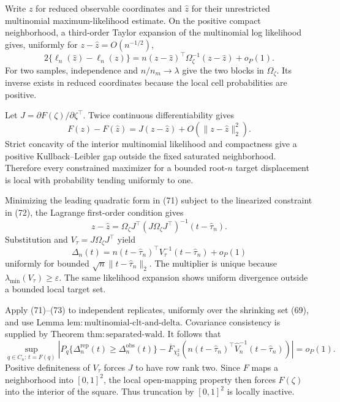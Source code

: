 Write \(z\) for reduced observable coordinates and \(\widehat z\) for their unrestricted multinomial maximum-likelihood estimate.  On the positive compact neighborhood, a third-order Taylor expansion of the multinomial log likelihood gives, uniformly for \(z-\widehat z=O(n^{-1/2})\),
\[
 2\{\ell_n(\widehat z)-\ell_n(z)\}
 =n(z-\widehat z)^{\top}\Omega_{\zeta}^{-1}
       (z-\widehat z)+o_P(1).                             \tag{71}
\]
For two samples, independence and \(n/n_m\to\lambda\) give the two blocks in \(\Omega_{\zeta}\).  Its inverse exists in reduced coordinates because the local cell probabilities are positive.

Let \(J=\partial F(\zeta)/\partial\zeta^{\top}\).  Twice continuous differentiability gives
\[
 F(z)-F(\widehat z)
 =J(z-\widehat z)+O(\|z-\widehat z\|_2^2).                \tag{72}
\]
Strict concavity of the interior multinomial likelihood and compactness give a positive Kullback--Leibler gap outside the fixed saturated neighborhood.  Therefore every constrained maximizer for a bounded root-\(n\) target displacement is local with probability tending uniformly to one.

Minimizing the leading quadratic form in (71) subject to the linearized constraint in (72), the Lagrange first-order condition gives
\[
 z-\widehat z
 =\Omega_{\zeta}J^{\top}
   (J\Omega_{\zeta}J^{\top})^{-1}(t-\widehat\tau_n).
\]
Substitution and \(V_{\tau}=J\Omega_{\zeta}J^{\top}\) yield
\[
 \Delta_n(t)
 =n(t-\widehat\tau_n)^{\top}V_{\tau}^{-1}
       (t-\widehat\tau_n)+o_P(1)                          \tag{73}
\]
uniformly for bounded \(\sqrt n\|t-\widehat\tau_n\|_2\).  The multiplier is unique because \(\lambda_{\min}(V_{\tau})\ge\varepsilon\).  The same likelihood expansion shows uniform divergence outside a bounded local target set.

Apply (71)--(73) to independent replicates, uniformly over the shrinking set (69), and use Lemma \(\mathrm{lem{:}multinomial\text{-}clt\text{-}and\text{-}delta}\).  Covariance consistency is supplied by Theorem \(\mathrm{thm{:}separated\text{-}wald}\).  It follows that
\[
 \sup_{q\in C_n:\,t=F(q)}
 \left|
 P_q\{\Delta_n^{\mathrm{rep}}(t)\ge\Delta_n^{\mathrm{obs}}(t)\}
 -\overline F_{\chi^2_2}\!\left(
 n(t-\widehat\tau_n)^{\top}\widehat V_n^{-1}
 (t-\widehat\tau_n)\right)
 \right|=o_P(1).                                          \tag{74}
\]
Positive definiteness of \(V_{\tau}\) forces \(J\) to have row rank two.  Since \(F\) maps a neighborhood into \([0,1]^2\), the local open-mapping property then forces \(F(\zeta)\) into the interior of the square.  Thus truncation by \([0,1]^2\) is locally inactive.


